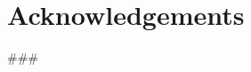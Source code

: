 \documentclass[11pt,a4paper,final,twoside]{memoir}
\begin{document}
\chapter*{Acknowledgements}
###
\thispagestyle{empty}
\clearpage

\begin{abstract}
###
\end{abstract}
\thispagestyle{empty}
\clearpage

\pagestyle{plain}

\setcounter{tocdepth}{2}
\tableofcontents
\clearpage

\listoffigures
\clearpage

\listoftables

\listofalgorithms

\openany




\mainmatter
\openright





%




\backmatter

\printglossary

\renewcommand{\bibname}{References}


\end{document}
